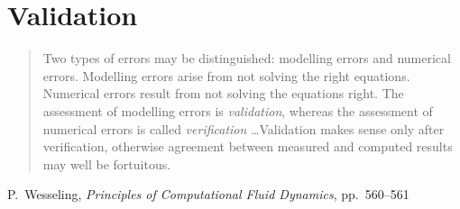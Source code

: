 \documentclass[11pt,final]{amsart}
\begin{document}

\clearpage\newpage
\section{Validation}\label{sect:valid}

\bigskip
\begin{quote}  Two types of errors may be distinguished: modelling errors and numerical errors.  Modelling errors arise from not solving the right equations.  Numerical errors result from not solving the equations right.  The assessment of modelling errors is \emph{validation}, whereas the assessment of numerical errors is called \emph{verification} \dots  Validation makes sense only after verification, otherwise agreement between measured and computed results may well be fortuitous.
\end{quote}
\hfill P.~Wesseling, \emph{Principles of Computational Fluid Dynamics}, pp.~560--561 \cite{Wesseling}
\bigskip
\end{document}
